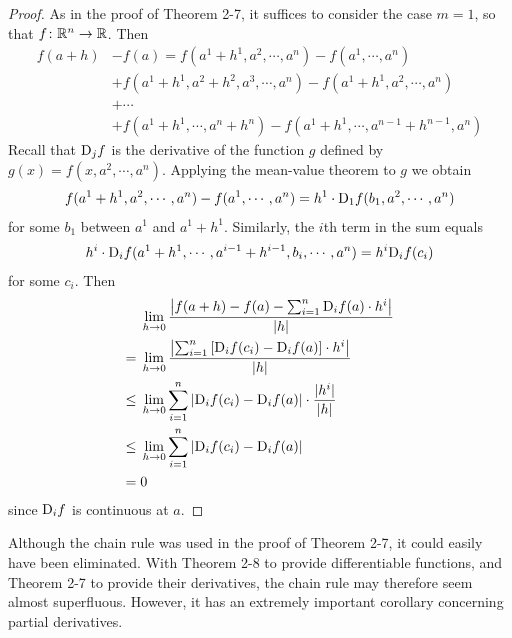 \begin{proof}
    As in the proof of Theorem 2-7, it suffices to consider the case $m = 1$, so that 
    $f\colon{}\mathbb{R}^n\to \mathbb{R}$. Then 
    \begin{align*}
        f(a+h) &  - f(a) = f(a^1+h^1, a^2, \cdots, a^n) - f(a^1, \cdots, a^n) \\
        & + f(a^1+h^1, a^2+h^2, a^3, \cdots, a^n) - f(a^1+h^1, a^2, \cdots, a^n) \\
        & + \cdots \\
        & + f(a^1+h^1, \cdots, a^n+h^n) - f(a^1+h^1, \cdots, a^{n-1}+h^{n-1}, a^n)
    \end{align*}
    Recall that $\mathrm{D}_jf$ is the derivative of the function $g$ defined by $g(x) = f(x, a^2, \cdots, a^n)$. Applying 
    the mean-value theorem to $g$ we obtain 
    \begin{align*}
        f(a^1+h^1, a^2, \cdots, a^n) - f(a^1, \cdots, a^n)
        = h^1\cdot \mathrm{D}_1f(b_1, a^2, \cdots, a^n)
    \end{align*}
    for some $b_1$ between $a^1$ and $a^1+h^1$. Similarly, the $i$th term in the sum equals
    \begin{align*}
        h^i\cdot \mathrm{D}_if(a^1+h^1, \cdots, a^{i-1}+h^{i-1}, b_i, \cdots, a^n)
        = h^i\mathrm{D}_if(c_i)
    \end{align*}
    for some $c_i$. Then 
    \begin{align*}
        &\lim_{h\to 0}{\frac{\left|f(a+h) - f(a) - \sum_{i=1}^{n }{\mathrm{D}_if(a)\cdot h^i}\right|}{|h|}} \\
        =\; & \lim_{h\to 0}{\frac{\left|\sum_{i=1}^{n }{\left[\mathrm{D}_if(c_i) - \mathrm{D}_if(a)\right]\cdot h^i}\right|}{|h|}} \\
        \le\; & \lim_{h\to 0}{\sum_{i=1}^{n }{\left|\mathrm{D}_if(c_i) - \mathrm{D}_if(a)\right|\cdot \frac{|h^i|}{|h|}}} \\
        \le\; & \lim_{h\to 0}{\sum_{i=1}^{n }{\left|\mathrm{D}_if(c_i) - \mathrm{D}_if(a)\right|}} \\
        =\; & 0
    \end{align*}
    since $\mathrm{D}_if$ is continuous at $a$.
\end{proof}

Although the chain rule was used in the proof of Theorem
2-7, it could easily have been eliminated. With Theorem 2-8 to
provide differentiable functions, and Theorem 2-7 to provide
their derivatives, the chain rule may therefore seem almost
superfluous. However, it has an extremely important corollary 
concerning partial derivatives.

